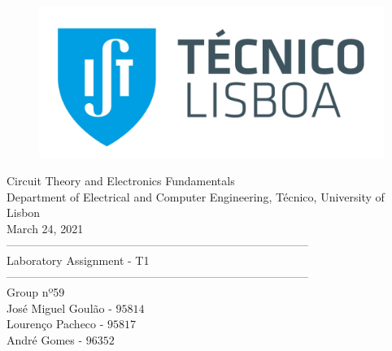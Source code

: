 
\thispagestyle {empty}


\begin{figure}[h]
	\centering
	\includegraphics[width = 0.5\linewidth]{ist_foto}
\end{figure}


\begin{center}

	\vspace{2cm}
	{\FontLb Circuit Theory and Electronics Fundamentals} \\

	\vspace{0.5cm}
	{\FontSn Department of Electrical and Computer Engineering, Técnico, University of Lisbon} \\

	\vspace{0.5cm}
	{\FontSn March 24, 2021} \\

	\vspace{1cm}
	{\FontLb --------------------------------------------------------------------------------} \\
	\vspace{0.1cm}
	{\FontLb Laboratory Assignment - T1} \\
	{\FontLb --------------------------------------------------------------------------------} \\

	\vspace{1cm}
	{\FontMb Group nº59} \\
	\vspace{0.25cm}
	{\FontSn José Miguel Goulão - $95814$} \\
	{\FontSn Lourenço Pacheco - $95817$} \\
	{\FontSn André Gomes - $96352$} \\

	\vspace{1cm}

\end{center}

